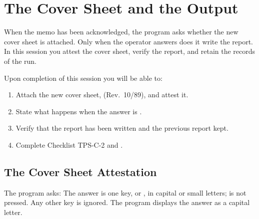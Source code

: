 \chapter{The Cover Sheet and the Output}

When the memo has been acknowledged, the program asks
whether the new cover sheet is attached.  Only when the operator answers
 does it write the report.  In this session you attest the cover
sheet, verify the report, and retain the records of the run.

Upon completion of this session you will be able to:
\begin{enumerate}
\item Attach the new cover sheet,  (Rev.\ 10/89), and attest it.
\item State what happens when the answer is .
\item Verify that the report has been written and the previous report kept.
\item Complete Checklist TPS-C-2 and .
\end{enumerate}

\section{The Cover Sheet Attestation}
The program asks:
The answer is one key,  or , in capital or small letters;
 is not pressed.  Any other key is ignored.  The program displays
the answer as a capital letter.

